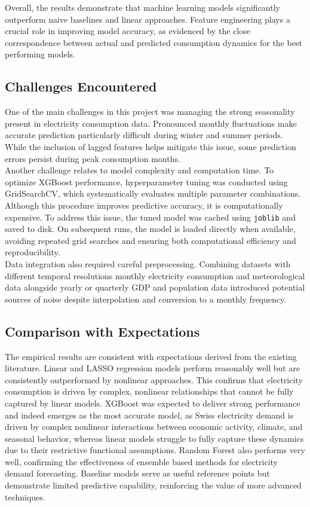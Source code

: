 \documentclass[11pt,a4paper]{article}
\begin{document}
Overall, the results demonstrate that machine learning models significantly outperform naive baselines and linear approaches. Feature engineering plays a crucial role in improving model accuracy, as evidenced by the close correspondence between actual and predicted consumption dynamics for the best performing models.

\subsection{Challenges Encountered}

One of the main challenges in this project was managing the strong seasonality present in electricity consumption data. Pronounced monthly fluctuations make accurate prediction particularly difficult during  winter and summer periods. While the inclusion of lagged features helps mitigate this issue, some prediction errors persist during peak consumption months.\\
Another challenge relates to model complexity and computation time. To optimize XGBoost performance, hyperparameter tuning was conducted using GridSearchCV, which systematically evaluates multiple parameter combinations. Although this procedure improves predictive accuracy, it is computationally expensive. To address this issue, the tuned model was cached using \texttt{joblib} and saved to disk. On subsequent runs, the model is loaded directly when available, avoiding repeated grid searches and ensuring both computational efficiency and reproducibility.\\
Data integration also required careful preprocessing. Combining datasets with different temporal resolutions monthly electricity consumption and meteorological data alongside yearly or quarterly GDP and population data introduced potential sources of noise despite interpolation and conversion to a monthly frequency.

\subsection{Comparison with Expectations}

The empirical results are consistent with expectations derived from the existing literature. Linear and LASSO regression models perform reasonably well but are consistently outperformed by nonlinear approaches. This confirms that electricity consumption is driven by complex, nonlinear relationships that cannot be fully captured by linear models. XGBoost was expected to deliver strong performance and indeed emerges as the most accurate model, as Swiss electricity demand is driven by complex nonlinear interactions between economic activity, climate, and seasonal behavior, whereas linear models struggle to fully capture these dynamics due to their restrictive functional assumptions. Random Forest also performs very well, confirming the effectiveness of ensemble based methods for electricity demand forecasting. Baseline models serve as useful reference points but demonstrate limited predictive capability, reinforcing the value of more advanced techniques.
\end{document}
